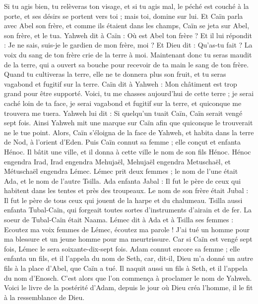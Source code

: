 \begin{multicols}{2}
Si tu agis bien, tu relèveras ton visage, et si tu agis mal, le péché est couché à la porte, et ses désirs se portent vers toi ;  mais toi, domine sur lui.
Et Caïn parla avec Abel son frère, et comme ils étaient dans les champs, Caïn se jeta sur Abel, son frère, et le tua.
Yahweh dit à Caïn : Où est Abel ton frère ? Et il lui répondit : Je ne sais, suis-je le gardien de mon frère, moi ?
Et Dieu dit : Qu'as-tu fait ? La voix du sang de ton frère crie de la terre à moi.
Maintenant donc tu seras maudit de la terre, qui a ouvert sa bouche pour recevoir de ta main le sang de ton frère.
Quand tu cultiveras la terre, elle ne te donnera plus son fruit, et tu seras vagabond et fugitif sur la terre.
Caïn dit à Yahweh : Mon châtiment est trop grand pour être supporté.
Voici, tu me chasses aujourd'hui de cette terre ; je serai caché loin de ta face, je serai vagabond et fugitif sur la terre, et quiconque me trouvera me tuera.
Yahweh lui dit : Si quelqu’un tuait Caïn, Caïn serait vengé sept fois. Ainsi Yahweh mit une marque sur Caïn afin que quiconque le trouverait ne le tue point.
Alors, Caïn s’éloigna de la face de Yahweh, et habita dans la terre de Nod, à l'orient d’Eden.
Puis Caïn connut sa femme ; elle conçut et enfanta Hénoc. Il bâtit une ville, et il donna à cette ville le nom de son fils Hénoc.
Hénoc engendra Irad, Irad engendra Mehujaël, Mehujaël engendra Metuschaël, et Métuschaël engendra Lémec.
Lémec prit deux femmes ; le nom de l'une était Ada, et le nom de l'autre Tsilla.
Ada enfanta Jabal : Il fut le père de ceux qui habitent dans les tentes et près des troupeaux.
Le nom de son frère était Jubal : Il fut le père de tous ceux qui jouent de la harpe et du chalumeau.
Tsilla aussi enfanta Tubal-Caïn, qui forgeait toutes sortes d'instruments d'airain et de fer. La soeur de Tubal-Caïn était Naama.
Lémec dit à Ada et à Tsilla ses femmes : Ecoutez ma voix femmes de Lémec, écoutez ma parole ! J’ai tué un homme pour ma blessure et un jeune homme pour ma meurtrissure.
Car si Caïn est vengé sept fois, Lémec le sera soixante-dix-sept fois.
Adam connut encore sa femme ; elle enfanta un fils, et il l’appela du nom de Seth, car, dit-il, Dieu m'a donné un autre fils à la place d'Abel, que Caïn a tué.
Il naquit aussi un fils à Seth, et il l'appela du nom d’Enosch. C’est alors que l’on commença à proclamer le nom de Yahweh.
\VerseOne{}Voici le livre de la postérité d'Adam, depuis le jour où Dieu créa l'homme, il le fit à la ressemblance de Dieu.

\end{multicols}
